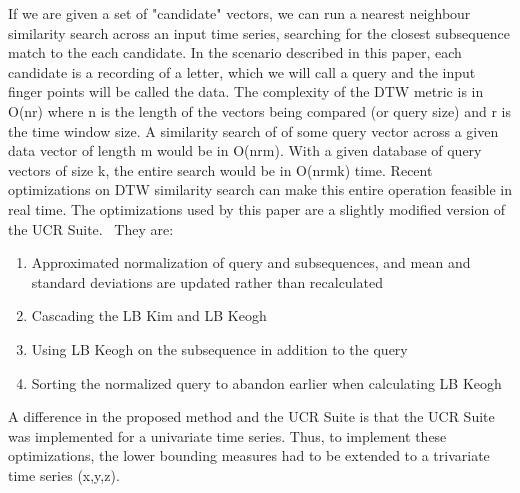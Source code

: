 If we are given a set of "candidate" vectors, we can run a nearest neighbour similarity search across an input time series, searching for the closest subsequence match to the each candidate. In the scenario described in this paper, each candidate is a recording of a letter, which we will call a query and the input finger points will be called the data.
The complexity of the DTW metric is in O(nr) where n is the length of the vectors being compared (or query size) and r is the time window size. A similarity search of of some query vector across a given data vector of length m would be in O(nrm). With a given database of query vectors of size k, the entire search would be in O(nrmk) time.
Recent optimizations on DTW similarity search can make this entire operation feasible in real time. The optimizations used by this paper are a slightly modified version of the UCR Suite.~\cite{rakthanmanon2012searching}
 They are: 
\begin{enumerate}
\item
Approximated normalization of query and subsequences, and mean and standard deviations are updated rather than recalculated
\item
Cascading the LB Kim and LB Keogh
\item
Using LB Keogh on the subsequence in addition to the query
\item
Sorting the normalized query to abandon earlier when calculating LB Keogh
\end{enumerate}
A difference in the proposed method and the UCR Suite is that the UCR Suite was implemented for a univariate time series. Thus, to implement these optimizations, the lower bounding measures had to be extended to a trivariate time series (x,y,z).~\cite{rath2002lower-bounding}

